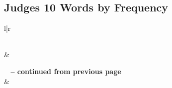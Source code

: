 

\subsection{Judges 10 Words by Frequency}


\normalsize
 
\begin{center}
\begin{longtable}{l|r}
\caption[Judges 10 Words by Frequency]{Judges 10 Words by Frequency}\label{table:WordsbyFrequency for Judges 10} \\
\hline {} &  \\ \hline 
\endfirsthead
 
{{\bfseries \tablename\ \thetable{} -- continued from previous page}} \\  
\hline {} &  \\ \hline 
\endhead
 

\end{longtable}
\end{center}
